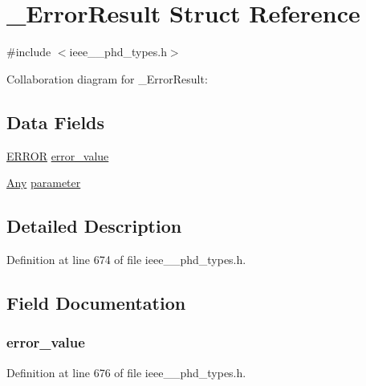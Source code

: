 \hypertarget{struct___error_result}{}\section{\+\_\+\+Error\+Result Struct Reference}
\label{struct___error_result}


{\ttfamily \#include $<$ieee\+\_\+\_\+phd\+\_\+types.\+h$>$}



Collaboration diagram for \+\_\+\+Error\+Result\+:
\subsection*{Data Fields}
\begin{DoxyCompactItemize}
\item 
\hyperlink{ieee__11073__phd__types_8h_a6debfc3907466430babb533dd29e385b}{E\+R\+R\+O\+R} \hyperlink{struct___error_result_a7af4423907a2d89a9cb0e9d06e312448}{error\+\_\+value}
\item 
\hyperlink{ieee__11073__phd__types_8h_a4decf91c0c44a2ed84549e41307f5fdb}{Any} \hyperlink{struct___error_result_aa1d8f12c642ce2b58d3af3dbcd2c6094}{parameter}
\end{DoxyCompactItemize}


\subsection{Detailed Description}


Definition at line 674 of file ieee\+\_\+\_\+phd\+\_\+types.\+h.



\subsection{Field Documentation}
\hypertarget{struct___error_result_a7af4423907a2d89a9cb0e9d06e312448}{}
\subsubsection[{error\+\_\+value}]{ error\+\_\+value}\label{struct___error_result_a7af4423907a2d89a9cb0e9d06e312448}


Definition at line 676 of file ieee\+\_\+\_\+phd\+\_\+types.\+h.

